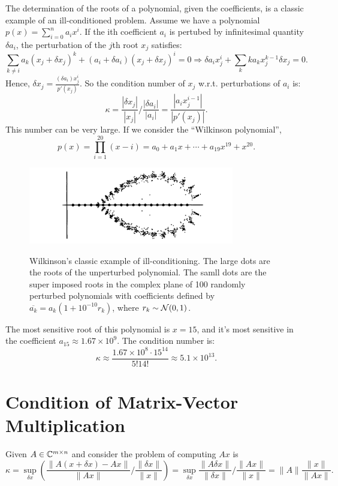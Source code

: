 \begin{example}
\label{eg: Root of Polynomial}
The determination of the roots of a polynomial, given the coefficients, is a classic example of an ill-conditioned problem. Assume we have a polynomial $p(x) = \sum_{i=0}^n a_i x^i$. If the ith coefficient $a_i$ is pertubed by infinitesimal quantity $\delta  a_i$, the perturbation of the $j$th root $x_j$ satisfies: 
\[
    \sum_{k \neq i} a_k (x_j + \delta  x_j)^k + (a_i+ \delta a_i) (x_j + \delta  x_j)^i = 0 \Rightarrow \delta a_i x_j^i + \sum_k k a_k x_j^{k-1} \delta x_j= 0. 
\]
Hence, $ \delta x_j = \frac{(\delta a_i) x_j^i}{p'(x_j) }. $  So the condition number of $x_j$ w.r.t. perturbations of $a_i$ is: 
\[
    \kappa = \frac{|\delta x_j|}{|x_j|}/ \frac{|\delta  a_i|}{|a_i|} = \frac{|a_i x_j^{i-1}|}{|p'(x_j)|}. 
\]
This number can be very large. If we consider the ``Wilkinson polynomial'', 
\[
    p(x) = \prod_{i=1}^20 (x-i) = a_0 + a_1 x + \cdots + a_{19} x^{19} + x^{20}.  
\]

\begin{figure}[H]
    \centering
    \includegraphics[width=0.8\textwidth]{figures/12-1.png}
    \label{fig: wikinson} 
    \caption{Wilkinson's classic example of ill-conditioning. The large dots are the roots of the unperturbed polynomial. The samll dots are the super imposed roots in the complex plane of 100 randomly perturbed polynomials with coefficients defined by $\overline{a_k} = a_k ( 1+ 10^{-10}r_k)$, where $r_k\sim \mathcal{N}(0,1)$. }
\end{figure}

The most sensitive root of this polynomial is $x=15$, and it's most sensitive in the coefficient $a_{15} \approx 1.67\times 10^9$. The condition number is: 
\[
    \kappa \approx \frac{1.67\times 10^8 \cdot 15^14}{5!14!} \approx 5.1 \times 10^{13}.
\]
\end{example}


\section{Condition of Matrix-Vector Multiplication} 
Given $A\in \mathbb{C}^{m\times n}$ and consider the problem of computing $Ax$ is 
\[
    \kappa=\sup _{\delta x}\left(\frac{\|A(x+\delta x)-A x\|}{\|A x\|} / \frac{\|\delta x\|}{\|x\|}\right)=\sup _{\delta x} \frac{\|A \delta x\|}{\|\delta x\|} / \frac{\|A x\|}{\|x\|} = \|A\| \frac{\|x\|}{\|Ax\|}.  
\]

